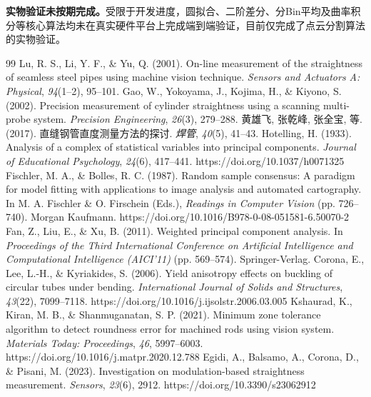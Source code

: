\documentclass{article}
\begin{document}
\textbf{实物验证未按期完成。}受限于开发进度，圆拟合、二阶差分、分Bin平均及曲率积分等核心算法均未在真实硬件平台上完成端到端验证，目前仅完成了点云分割算法的实物验证。

\begin{thebibliography}{99}
	 Lu, R. S., Li, Y. F., \& Yu, Q. (2001). On-line measurement of the straightness of seamless steel pipes using machine vision technique. \textit{Sensors and Actuators A: Physical}, \textit{94}(1--2), 95--101.
	 Gao, W., Yokoyama, J., Kojima, H., \& Kiyono, S. (2002). Precision measurement of cylinder straightness using a scanning multi-probe system. \textit{Precision Engineering}, \textit{26}(3), 279--288.
	 黄雄飞, 张乾峰, 张全宝, 等. (2017). 直缝钢管直度测量方法的探讨. \textit{焊管}, \textit{40}(5), 41--43.
	 Hotelling, H. (1933). Analysis of a complex of statistical variables into principal components. \textit{Journal of Educational Psychology}, \textit{24}(6), 417--441. https://doi.org/10.1037/h0071325
	 Fischler, M. A., \& Bolles, R. C. (1987). Random sample consensus: A paradigm for model fitting with applications to image analysis and automated cartography. In M. A. Fischler \& O. Firschein (Eds.), \textit{Readings in Computer Vision} (pp. 726--740). Morgan Kaufmann. https://doi.org/10.1016/B978-0-08-051581-6.50070-2
	 Fan, Z., Liu, E., \& Xu, B. (2011). Weighted principal component analysis. In \textit{Proceedings of the Third International Conference on Artificial Intelligence and Computational Intelligence (AICI'11)} (pp. 569--574). Springer-Verlag.
	 Corona, E., Lee, L.-H., \& Kyriakides, S. (2006). Yield anisotropy effects on buckling of circular tubes under bending. \textit{International Journal of Solids and Structures}, \textit{43}(22), 7099--7118. https://doi.org/10.1016/j.ijsolstr.2006.03.005
	 Kshaurad, K., Kiran, M. B., \& Shanmuganatan, S. P. (2021). Minimum zone tolerance algorithm to detect roundness error for machined rods using vision system. \textit{Materials Today: Proceedings}, \textit{46}, 5997--6003. https://doi.org/10.1016/j.matpr.2020.12.788
	 Egidi, A., Balsamo, A., Corona, D., \& Pisani, M. (2023). Investigation on modulation-based straightness measurement. \textit{Sensors}, \textit{23}(6), 2912. https://doi.org/10.3390/s23062912
\end{thebibliography}
\end{document}
